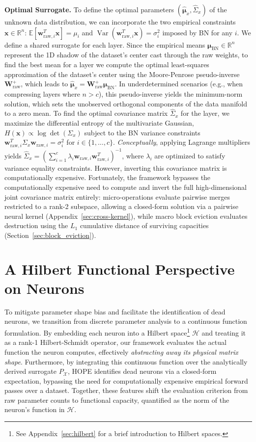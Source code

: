 \documentclass[11pt, a4paper, copyright, gdm]{google}
\newcommand{\wVect}{\boldsymbol{w}}
\newcommand{\xVect}{\boldsymbol{x}}
\newcommand{\muVect}{\boldsymbol{\mu}}
\newcommand{\calH}{\mathcal{H}}
\newcommand{\calX}{\mathcal{X}}
\newcommand{\R}{\mathbb{R}}
\newcommand{\E}{\mathbb{E}}
\newcommand{\Wmat}{\boldsymbol{W}}
\DeclareMathOperator{\Var}{Var}
\theoremstyle{definition}
\begin{document}
\noindent \textbf{Optimal Surrogate.} To define the optimal parameters $(\hat{\muVect}_x, \hat{\Sigma}_x)$ of the unknown data distribution, we can incorporate the two empirical constraints $\xVect \in \R^n$: $\E[\wVect_{\text{raw}, i}^T \xVect] = \mu_i$ and $\Var(\wVect_{\text{raw}, i}^T \xVect) = \sigma_i^2$ imposed by BN for any $i$. We define a shared surrogate for each layer. Since the empirical means $\muVect_{\text{BN}} \in \R^n$ represent the 1D shadow of the dataset's center cast through the raw weights, to find the best mean for a layer we compute the optimal least-squares approximation of the dataset's center using the Moore-Penrose pseudo-inverse $\Wmat_{\text{raw}}^+$, which leads to $\hat{\muVect}_x = \Wmat_{\text{raw}}^+ \muVect_{\text{BN}}$. In underdetermined scenarios (e.g., when compressing layers where $n > c$), this pseudo-inverse yields the minimum-norm solution, which sets the unobserved orthogonal components of the data manifold to a zero mean. To find the optimal covariance matrix $\hat{\Sigma}_x$ for the layer, we maximize the differential entropy of the multivariate Gaussian, $H(\xVect) \propto \log \det(\Sigma_x)$ subject to the BN variance constraints $\wVect_{\text{raw}, i}^T \Sigma_x \wVect_{\text{raw}, i} = \sigma_i^2$ for $i \in \{1, \dots, c\}$. 
\textit{Conceptually}, applying Lagrange multipliers yields $\hat{\Sigma}_x = \left( \sum_{i=1}^c \lambda_i \wVect_{\text{raw}, i} \wVect_{\text{raw}, i}^T \right)^{-1}$, where $\lambda_i$ are optimized to satisfy variance equality constraints. However, inverting this covariance matrix is computationally expensive. Fortunately, the framework bypasses the computationally expensive need to compute and invert the full high-dimensional joint covariance matrix entirely: micro-operations evaluate pairwise merges restricted to a rank-2 subspace, allowing a closed-form solution via a pairwise neural kernel (Appendix~\ref{sec:cross-kernel}), while macro block eviction evaluates destruction using the $L_1$ cumulative distance of surviving capacities (Section~\ref{sec:block_eviction}).

\section{A Hilbert Functional Perspective on Neurons}
\label{sec:capacity}
To mitigate parameter shape bias and facilitate the identification of dead neurons, we transition from discrete parameter analysis to a continuous function formulation. By embedding each neuron into a Hilbert space\footnote{See Appendix~\ref{sec:hilbert} for a brief introduction to Hilbert spaces.} $\calH$ and treating it as a rank-1 Hilbert-Schmidt operator, our framework evaluates the actual function the neuron computes, effectively \textit{abstracting away its physical matrix shape}. Furthermore, by integrating this continuous function over the analytically derived surrogate $P_{\calX}$, HOPE identifies dead neurons via a closed-form expectation, bypassing the need for computationally expensive empirical forward passes over a dataset. Together, these features shift the evaluation criterion from raw parameter counts to functional capacity, quantified as the norm of the neuron's function in $\calH$.
\end{document}
